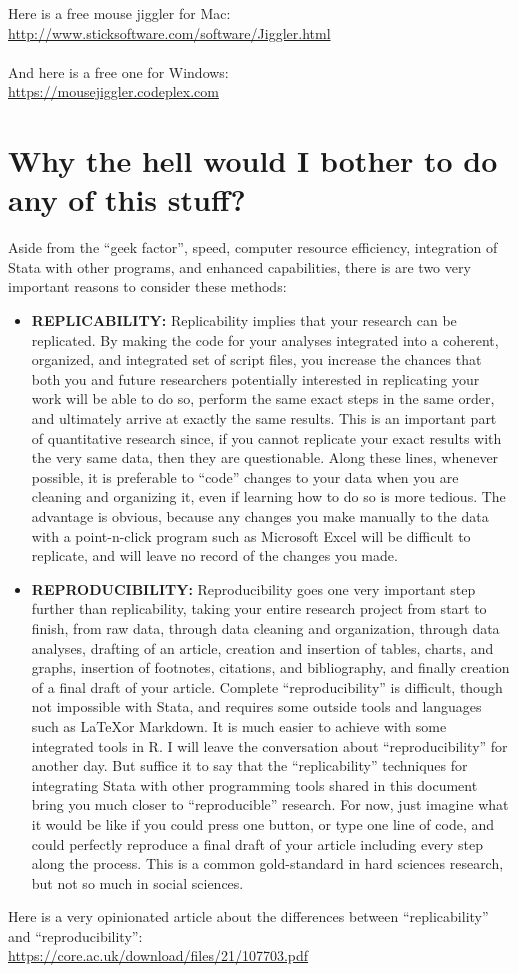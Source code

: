 \documentclass[11pt]{article}
\begin{document}
\noindent Here is a free mouse jiggler for Mac:\\
\url{http://www.sticksoftware.com/software/Jiggler.html}\\
\\
\noindent And here is a free one for Windows:\\
\url{https://mousejiggler.codeplex.com}

\section{Why the hell would I bother to do any of this stuff?}

\noindent Aside from the ``geek factor'', speed, computer resource efficiency, integration of Stata with other programs, and enhanced capabilities, there is are two very important reasons to consider these methods:

\begin{itemize}
\item {\bf\Large REPLICABILITY:} Replicability implies that your research can be replicated. By making the code for your analyses integrated into a coherent, organized, and integrated set of script files, you increase the chances that both you and future researchers potentially interested in replicating your work will be able to do so, perform the same exact steps in the same order, and ultimately arrive at exactly the same results. This is an important part of quantitative research since, if you cannot replicate your exact results with the very same data, then they are questionable. Along these lines, whenever possible, it is preferable to ``code'' changes to your data when you are cleaning and organizing it, even if learning how to do so is more tedious. The advantage is obvious, because any changes you make manually to the data with a point-n-click program such as Microsoft Excel will be difficult to replicate, and will leave no record of the changes you made.
\item {\bf\Large REPRODUCIBILITY:} Reproducibility goes one very important step further than replicability, taking your entire research project from start to finish, from raw data, through data cleaning and organization, through data analyses, drafting of an article, creation and insertion of tables, charts, and graphs, insertion of footnotes, citations, and bibliography, and finally creation of a final draft of your article. Complete ``reproducibility'' is difficult, though not impossible with Stata, and requires some outside tools and languages such as \LaTeX or Markdown. It is much easier to achieve with some integrated tools in R. I will leave the conversation about ``reproducibility'' for another day. But suffice it to say that the ``replicability'' techniques for integrating Stata with other programming tools shared in this document bring you much closer to ``reproducible'' research. For now, just imagine what it would be like if you could press one button, or type one line of code, and could perfectly reproduce a final draft of your article including every step along the process. This is a common gold-standard in hard sciences research, but not so much in social sciences.
\end{itemize}

\noindent Here is a very opinionated article about the differences between ``replicability'' and ``reproducibility'':\\
\url{https://core.ac.uk/download/files/21/107703.pdf}
\end{document}
